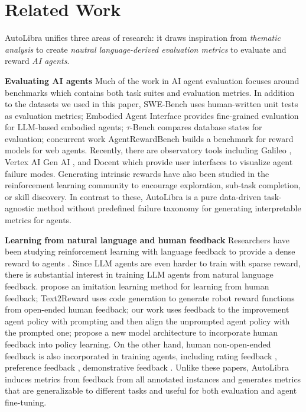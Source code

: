 \documentclass[../main.tex]{subfiles}
\begin{document}
\section{Related Work}
AutoLibra unifies three areas of research: it draws inspiration from \textit{thematic
analysis} to create \textit{nautral language-derived evaluation metrics} to evaluate
and reward \textit{AI agents}.

\noindent\textbf{Evaluating AI agents}
Much of the work in AI agent evaluation focuses around benchmarks which contains
both task suites and evaluation metrics. In addition to the datasets we used in
this paper, SWE-Bench \citep{jimenezswe} uses human-written unit tests as
evaluation metrics; Embodied Agent Interface \citep{li2024embodied} provides
fine-grained evaluation for LLM-based embodied agents; $\tau$-Bench \citep{yao2024tau}
compares database states for evaluation; concurrent work AgentRewardBench \citep{lù2025agentrewardbenchevaluatingautomaticevaluations}
builds a benchmark for reward models for web agents. Recently, there are
observatory tools including Galileo \citep{galileo_agentic}, Vertex AI Gen AI
\citep{google_agent_eval}, and Docent \citep{meng2025docent} which provide user interfaces
to visualize agent failure modes. Generating intrinsic rewards have also been
studied in the reinforcement learning community \citep{du2019liir,pathakICMl17curiosity,laskin2022cic}
to encourage exploration, sub-task completion, or skill discovery. In contrast
to these, AutoLibra is a pure data-driven task-agnostic method without predefined
failure taxonomy for generating interpretable metrics for agents.

\noindent\textbf{Learning from natural language and human feedback}
Researchers have been studying reinforcement learning with language feedback to
provide a dense reward to agents \citep{goyal2019using}. Since LLM agents are
even harder to train with sparse reward, there is substantial interest in training
LLM agents from natural language feedback. \citet{chen2024learning} propose an imitation
learning method for learning from human feedback; Text2Reward \citep{xietext2reward}
uses code generation to generate robot reward functions from open-ended human feedback;
our work \citep{chen2025fine} uses feedback to the improvement agent policy with
prompting and then align the unprompted agent policy with the prompted one;
\citet{shi2024yell} propose a new model architecture to incorporate human feedback
into policy learning. On the other hand, human non-open-ended feedback is also incorporated
in training agents, including rating feedback \citep{nguyen2017reinforcement},
preference feedback \citep{christiano2017deep}, demonstrative feedback \citep{shaikhaligning}.
Unlike these papers, AutoLibra induces metrics from feedback from all annotated instances
and generates metrics that are generalizable to different tasks and useful for both
evaluation and agent fine-tuning.
\end{document}
